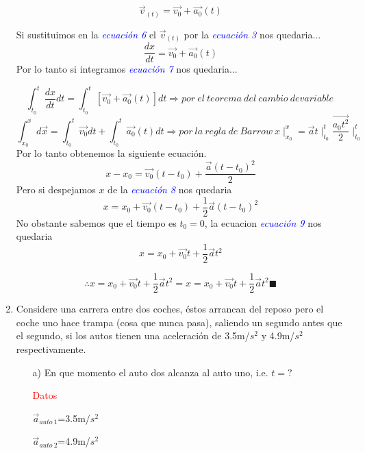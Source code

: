 \documentclass[letterpaper,12pt]{article}
\begin{document}
\begin{enumerate}
\begin{equation}
     \Vec{v}_{(t)} =\Vec {v_0}+\Vec{a_0}(t)
\end{equation}

Si sustituimos en la  \textcolor{blue}{\textit{ecuación 6}} el   $\Vec{v}_{(t)}$ por la \textcolor{blue}{\textit{ecuación 3}} nos quedaria...
\begin{equation}
      \frac{dx}{dt}=\Vec {v_0}+\Vec{a_0}(t)
\end{equation}
Por lo tanto si integramos {\textcolor{blue}{\textit{ecuación 7}}} nos quedaria...

$$\int_{t_0}^{t}\frac{dx}{dt} dt=\int_{t_0}^{t}[\Vec {v_0}+\Vec{a_0}(t)]dt  \Rightarrow  por\ el\ teorema\ del\ cambio\ devariable\ $$ $$\int_{{x_0}}^{{x}} d\Vec{x}=\int_{t_0}^{t}\Vec{v_0} dt+\int_{t_0}^{t}\Vec{a_0}(t)dt  \Rightarrow por\ la\ regla\ de\ Barrow\  {x}\mid _{ {x_0}}^{x}= {\Vec{a}}t \mid _{t_0}^{t}\frac{\Vec{a_0t^{2}}}{2}\mid _{t_0}^{t}$$
Por lo tanto obtenemos la siguiente ecuación.
\begin{equation}
      {x}-{x_0}=\Vec{v_0}(t-t_0)+\frac{\Vec{a}(t-t_0)^{2}}{2}
\end{equation}
Pero si despejamos ${x}$ de la {\textcolor{blue}{\textit{ecuación 8}}} nos quedaria 
\begin{equation}
      {x}={x_0}+\Vec{v_0}(t-t_0)+\frac{1}{2}\Vec{a}(t-t_0)^{2}
\end{equation}
No obstante sabemos que el tiempo es $t_0=0$, la ecuacion {\textcolor{blue}{\textit{ecuación 9}}} nos quedaria 
\begin{equation}
      {x}={x_0}+\Vec{v_0}t+\frac{1}{2}\Vec{a}t^{2}
\end{equation}

$$\therefore {x}={x_0}+\Vec{v_0}t+\frac{1}{2}\Vec{a}t^{2} = {x}={x_0}+\Vec{v_0}t+\frac{1}{2}\Vec{a}t^{2}\blacksquare$$ 
    \item Considere una carrera entre dos coches, éstos arrancan del reposo pero el coche uno hace trampa (cosa que nunca pasa), saliendo un segundo antes que el segundo, si los autos tienen una aceleración de 3.5m/$s^{2}$ y 4.9m/$s^{2}$ respectivamente. 
     \begin {itemize}
    \item[a)] En que momento el auto dos alcanza al auto uno, i.e. $t =?$
    
    {\textcolor{red}{Datos}}
    
    $\Vec{a}_{auto \ 1}$=3.5m/$s^{2}$
    
    $\Vec{a}_{auto \ 2}$=4.9m/$s^{2}$
    

\end{itemize}
\end{enumerate}
\end{document}
